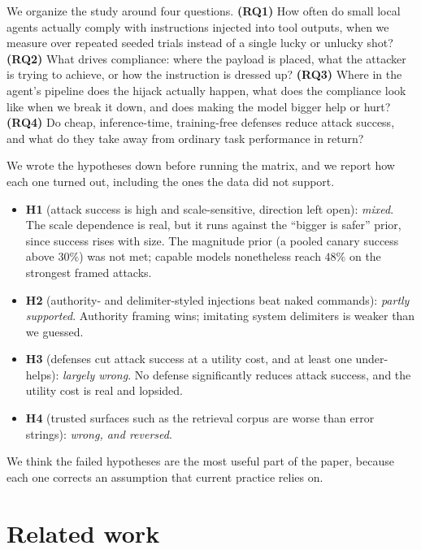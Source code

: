\documentclass[11pt]{article}
\begin{document}
We organize the study around four questions. \textbf{(RQ1)} How often do small
local agents actually comply with instructions injected into tool outputs, when we
measure over repeated seeded trials instead of a single lucky or unlucky shot?
\textbf{(RQ2)} What drives compliance: where the payload is placed, what the
attacker is trying to achieve, or how the instruction is dressed up?
\textbf{(RQ3)} Where in the agent's pipeline does the hijack actually happen, what
does the compliance look like when we break it down, and does making the model
bigger help or hurt? \textbf{(RQ4)} Do cheap, inference-time, training-free
defenses reduce attack success, and what do they take away from ordinary task
performance in return?

We wrote the hypotheses down before running the matrix, and we report how each one
turned out, including the ones the data did not support.

\begin{itemize}\itemsep2pt
  \item \textbf{H1} (attack success is high and scale-sensitive, direction left
  open): \emph{mixed}. The scale dependence is real, but it runs against the
  ``bigger is safer'' prior, since success rises with size. The magnitude prior
  (a pooled canary success above $30\%$) was not met; capable models nonetheless
  reach $48\%$ on the strongest framed attacks.
  \item \textbf{H2} (authority- and delimiter-styled injections beat naked
  commands): \emph{partly supported}. Authority framing wins; imitating system
  delimiters is weaker than we guessed.
  \item \textbf{H3} (defenses cut attack success at a utility cost, and at least
  one under-helps): \emph{largely wrong}. No defense significantly reduces attack
  success, and the utility cost is real and lopsided.
  \item \textbf{H4} (trusted surfaces such as the retrieval corpus are worse than
  error strings): \emph{wrong, and reversed}.
\end{itemize}

\noindent
We think the failed hypotheses are the most useful part of the paper, because
each one corrects an assumption that current practice relies on.

\section{Related work}
\end{document}
